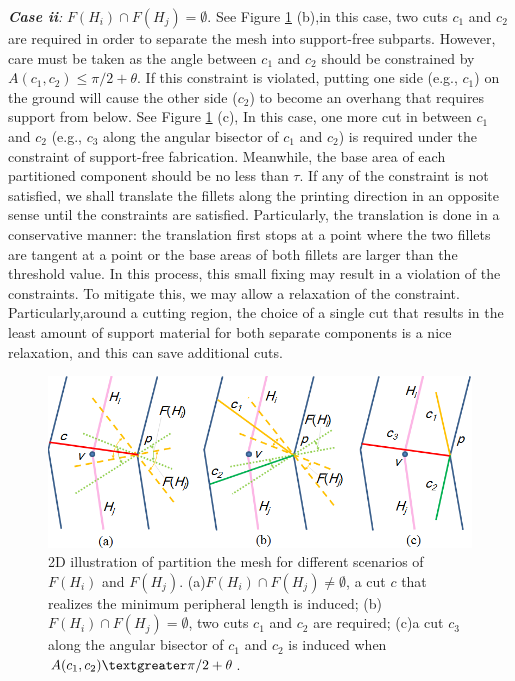 \emph{\textbf{Case ii}:} $F(H_i) \cap F(H_j) = \emptyset$. See Figure \ref{fig:meshpartition} (b),in this case, two cuts $c_1$ and $c_2$ are required in order to separate the mesh into support-free subparts. However, care must be taken as the angle between $c_1$ and $c_2$ should be constrained by $A(c_1, c_2) \leq \pi/2+\theta$. If this constraint is violated, putting one side (e.g., $c_1$) on the ground will cause the other side ($c_2$) to become an overhang that requires support from below. See Figure \ref{fig:meshpartition} (c), In this case, one more cut in between $c_1$ and $c_2$ (e.g., $c_3$ along the angular bisector of $c_1$ and $c_2$) is required under the constraint of support-free fabrication. Meanwhile, the base area of each partitioned component should be no less than $\tau$. If any of the constraint is not satisfied, we shall translate the fillets along the printing direction in an opposite sense until the constraints are satisfied. Particularly, the translation is done in a conservative manner: the translation first stops at a point where the two fillets are tangent at a point or the base areas of both fillets are larger than the threshold value. In this process, this small fixing may result in a violation of the constraints. To mitigate this, we may allow a relaxation of the constraint. Particularly,around a cutting region, the choice of a single cut that results in the least amount of support material for both separate components is a nice relaxation, and this can save additional cuts.

\begin{figure}[tbp]
  \centering
  \includegraphics[width=0.9\linewidth]{figs/meshpartition.png}
  \caption{\label{fig:meshpartition}%
           2D illustration of partition the mesh for different scenarios of $F(H_i)$ and $F(H_j)$. (a)$F(H_i) \cap F(H_j) \neq \emptyset$, a cut $c$ that realizes the minimum peripheral length is induced; (b)$F(H_i) \cap F(H_j) = \emptyset$, two cuts $c_1$ and $c_2$ are required; (c)a cut $c_3$ along the angular bisector of $c_1$ and $c_2$ is induced when $A(c_1, c_2) \textgreater  \pi/2+\theta$. }
\end{figure}

